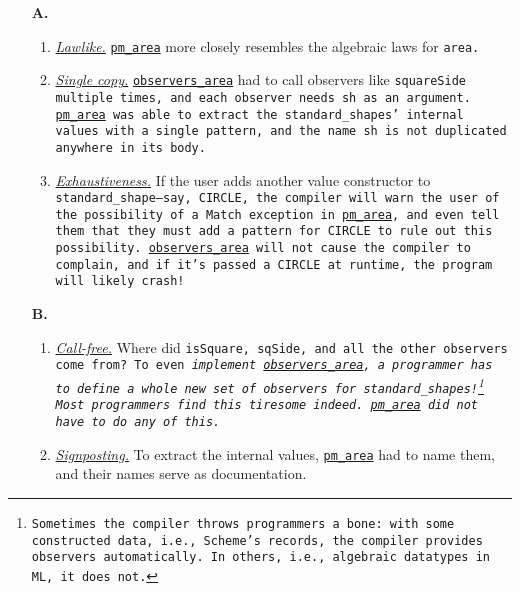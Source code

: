 \documentclass[manuscript,screen,review, 12pt, nonacm]{acmart}
\begin{document}
    \begin{enumerate}
      \item [\textbf{A.}]
      \begin{enumerate}[label=\arabic*]
        \item \hyperref[p1]{\it{Lawlike.}}
        \hyperref[fig:pmarea]{\tt{pm\_area}} more closely resembles the
        algebraic laws for \tt{area}. 
        \item \hyperref[p2]{\it{Single copy.}}
        \hyperref[fig:observersarea]{\tt{observers\_area}} had to call observers
        like \tt{squareSide} multiple times, and each observer needs \tt{sh} as
        an argument. \hyperref[fig:pmarea]{\tt{pm\_area}} was able to extract
        the \tt{standard\_shape}s' internal values with a single pattern, and
        the name \tt{sh} is not duplicated anywhere in its body. 
        \item \hyperref[p5]{\it{Exhaustiveness.}} 
        If the user adds another value
        constructor to \tt{standard\_shape}---say, \tt{CIRCLE}, the compiler
        will warn the user of the possibility of a \tt{Match} exception in
        \hyperref[fig:pmarea]{\tt{pm\_area}}, and even tell them that they must
        add a pattern for \tt{CIRCLE} to rule out this possibility.
        \hyperref[fig:observersarea]{\tt{observers\_area}} will not cause the
        compiler to complain, and if it's passed a \tt{CIRCLE} at runtime, the
        program will likely crash! 
    \end{enumerate}
      
    \item [\textbf{B.}]
      \begin{enumerate}[start=4, label=\arabic*]
        \item \hyperref[p3]{\it{Call-free.}} Where did \tt{isSquare},
        \tt{sqSide}, and all the other observers come from? To even
        \it{implement} \hyperref[fig:observersarea]{\tt{observers\_area}}, a
        programmer has to define a whole new set of observers for
        \tt{standard\_shape}s!\footnote{Sometimes the compiler throws
        programmers a bone: with some constructed data, i.e., Scheme's records,
        the compiler provides observers automatically. In others, i.e.,
        algebraic datatypes in ML, it does not.} Most programmers find this
        tiresome indeed. \hyperref[fig:pmarea]{\tt{pm\_area}} did not have to do
        any of this.
        \item \hyperref[p4]{\it{Signposting.}} 
        To extract the internal values,
        \hyperref[fig:pmarea]{\tt{pm\_area}} had to name them, and their names
        serve as documentation. 
      \end{enumerate}
    \end{enumerate}
\end{document}
